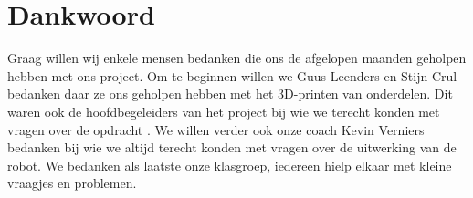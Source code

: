 \chapter{Dankwoord}
Graag willen wij enkele mensen bedanken die ons de afgelopen maanden geholpen hebben met ons project.
Om te beginnen willen we Guus Leenders en Stijn Crul bedanken daar ze ons geholpen hebben met het 3D-printen van onderdelen. Dit waren ook de hoofdbegeleiders van het project bij wie we terecht konden met vragen over de opdracht . We willen verder ook onze coach Kevin Verniers bedanken bij wie we altijd terecht konden met vragen over de uitwerking van de robot. We bedanken als laatste onze klasgroep, iedereen hielp elkaar met kleine vraagjes en problemen.

